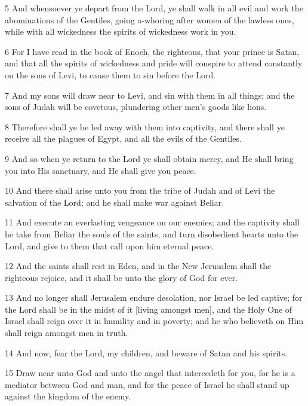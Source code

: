 \par 5 And whensoever ye depart from the Lord, ye shall walk in all evil and work the abominations of the Gentiles, going a-whoring after women of the lawless ones, while with all wickedness the spirits of wickedness work in you.

\par 6 For I have read in the book of Enoch, the righteous, that your prince is Satan, and that all the spirits of wickedness and pride will conspire to attend constantly on the sons of Levi, to cause them to sin before the Lord.

\par 7 And my sons will draw near to Levi, and sin with them in all things; and the sons of Judah will be covetous, plundering other men's goods like lions.

\par 8 Therefore shall ye be led away with them into captivity, and there shall ye receive all the plagues of Egypt, and all the evils of the Gentiles.

\par 9 And so when ye return to the Lord ye shall obtain mercy, and He shall bring you into His sanctuary, and He shall give you peace.

\par 10 And there shall arise unto you from the tribe of Judah and of Levi the salvation of the Lord; and he shall make war against Beliar.

\par 11 And execute an everlasting vengeance on our enemies; and the captivity shall he take from Beliar the souls of the saints, and turn disobedient hearts unto the Lord, and give to them that call upon him eternal peace.

\par 12 And the saints shall rest in Eden, and in the New Jerusalem shall the righteous rejoice, and it shall be unto the glory of God for ever.

\par 13 And no longer shall Jerusalem endure desolation, nor Israel be led captive; for the Lord shall be in the midst of it [living amongst men], and the Holy One of Israel shall reign over it in humility and in poverty; and he who believeth on Him shall reign amongst men in truth.

\par 14 And now, fear the Lord, my children, and beware of Satan and his spirits.

\par 15 Draw near unto God and unto the angel that intercedeth for you, for he is a mediator between God and man, and for the peace of Israel he shall stand up against the kingdom of the enemy.

